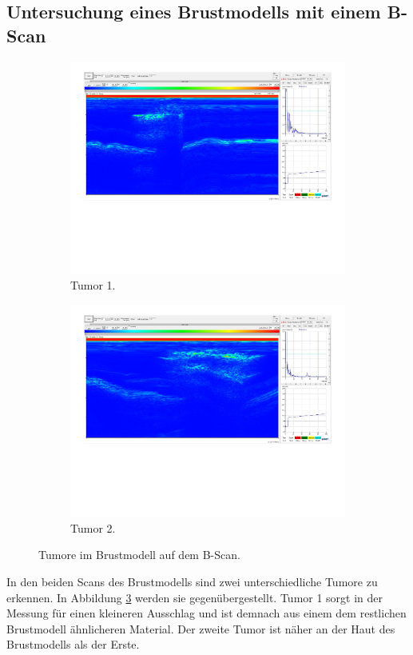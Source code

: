 \subsection{Untersuchung eines Brustmodells mit einem B-Scan}%
\begin{figure}%
    \begin{subfigure}{0.48\textwidth}%
        \centering%
        \includegraphics[width=\textwidth]{Messdaten/Tumor 1D.pdf}%
        \caption{Tumor 1.}%
        \label{fig:tumor_1}%
    \end{subfigure}%
    \begin{subfigure}{0.48\textwidth}%
        \centering%
        \includegraphics[width=\textwidth]{Messdaten/Tumor 2B.pdf}%
        \caption{Tumor 2.}%
        \label{fig:tumor_2}%
    \end{subfigure}%
    \caption{Tumore im Brustmodell auf dem B-Scan.}%
    \label{fig:tumore}
\end{figure}%

In den beiden Scans des Brustmodells sind zwei unterschiedliche Tumore zu erkennen.
In Abbildung \ref{fig:tumore} werden sie gegenübergestellt.
Tumor 1 sorgt in der Messung für einen kleineren Ausschlag und ist demnach aus einem dem restlichen Brustmodell ähnlicheren Material.
Der zweite Tumor ist näher an der Haut des Brustmodells als der Erste.